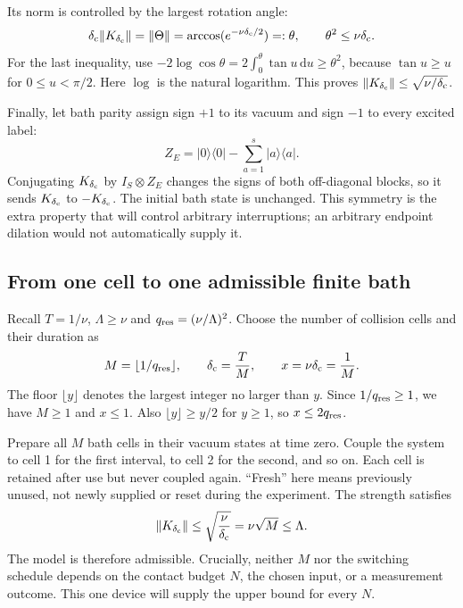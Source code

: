 \documentclass[11pt,a4paper]{article}
\numberwithin{equation}{section}
\theoremstyle{remark}
\newcommand{\dd}{\mathrm d}
\begin{document}
Its norm is controlled by the largest rotation angle:
\begin{equation}
 \delta_{\rm c}\|K_{\delta_{\rm c}}\|=\|\Theta\|
 =\arccos(e^{-\nu \delta_{\rm c}/2})=:\theta,
 \qquad \theta^2\le\nu \delta_{\rm c}.
 \label{sim:angle-bound}
\end{equation}
For the last inequality, use
$-2\log\cos\theta=2\int_0^\theta\tan u\,\dd u\ge\theta^2$,
because $\tan u\ge u$ for $0\le u<\pi/2$. Here $\log$ is the natural
logarithm. This proves $\|K_{\delta_{\rm c}}\|\le\sqrt{\nu/\delta_{\rm c}}$.

Finally, let bath parity assign sign $+1$ to its vacuum and sign $-1$
to every excited label:
\begin{equation}
 Z_E=|0\rangle\langle0|-\sum_{a=1}^s|a\rangle\langle a|.
 \label{sim:bath-parity}
\end{equation}
Conjugating $K_{\delta_{\rm c}}$ by $I_S\otimes Z_E$ changes the signs of both
off-diagonal blocks, so it sends $K_{\delta_{\rm c}}$ to $-K_{\delta_{\rm c}}$. The initial bath
state is unchanged. This symmetry is the extra property that will
control arbitrary interruptions; an arbitrary endpoint dilation would
not automatically supply it.

\subsection{From one cell to one admissible finite bath}
\label{sim:grid}

Recall $T=1/\nu$, $\Lambda\ge\nu$ and $q_{\rm res}=(\nu/\Lambda)^2$.
Choose the number of collision cells and their duration as
\begin{equation}
 M=\lfloor1/q_{\rm res}\rfloor,\qquad
 \delta_{\rm c}=\frac{T}{M},\qquad
 x=\nu \delta_{\rm c}=\frac1{M}.
 \label{sim:grid-choice}
\end{equation}
The floor $\lfloor y\rfloor$ denotes the largest integer no larger
than $y$. Since $1/q_{\rm res}\ge1$, we have $M\ge1$ and
$x\le1$. Also $\lfloor y\rfloor\ge y/2$ for $y\ge1$, so $x\le2q_{\rm res}$.

Prepare all $M$ bath cells in their vacuum states at time
zero. Couple the system to cell 1 for the first interval, to cell 2 for
the second, and so on. Each cell is retained after use but never coupled
again. ``Fresh'' here means previously unused, not newly supplied or
reset during the experiment. The strength satisfies
\begin{equation}
 \|K_{\delta_{\rm c}}\|\le\sqrt{\frac{\nu}{\delta_{\rm c}}}
 =\nu\sqrt{M}\le\Lambda.
 \label{sim:grid-strength}
\end{equation}
The model is therefore admissible. Crucially, neither $M$
nor the switching schedule depends on the contact budget $N$, the
chosen input, or a measurement outcome. This one device will supply
the upper bound for every $N$.
\end{document}
